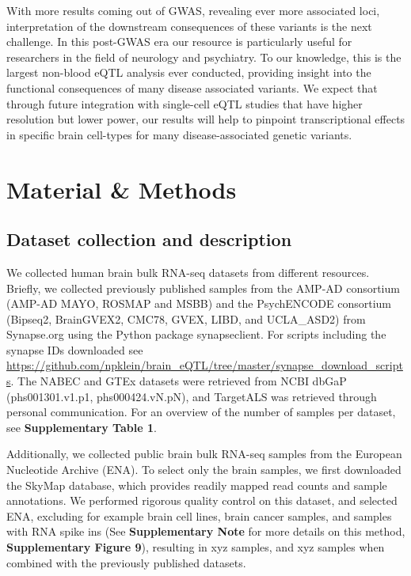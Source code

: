 {{With more results coming out of GWAS, revealing ever more associated loci, interpretation of the downstream consequences of these variants is the next challenge. In this post-GWAS era our resource is particularly useful for researchers in the field of neurology and psychiatry. To our knowledge, this is the largest non-blood eQTL analysis ever conducted, providing insight into the functional consequences of many disease associated variants. We expect that through future integration with single-cell eQTL studies that have higher resolution but lower power, our results will help to pinpoint transcriptional effects in specific brain cell-types for many disease-associated genetic variants. 

\section{Material \& Methods}
\subsection{Dataset collection and description }
We collected human brain bulk RNA-seq datasets from different resources. Briefly, we collected previously published samples from the AMP-AD consortium (AMP-AD MAYO\cite{hodesAcceleratingMedicinesPartnership2016}, ROSMAP\cite{hodesAcceleratingMedicinesPartnership2016} and MSBB\cite{hodesAcceleratingMedicinesPartnership2016}) and the PsychENCODE consortium (Bipseq2, BrainGVEX2, CMC78, GVEX, LIBD, and UCLA\_ASD2) from Synapse.org using the Python package synapseclient\cite{teamSynapseclientClientSynapse}. For scripts including the synapse IDs downloaded see \url{https://github.com/npklein/brain\_eQTL/tree/master/synapse\_download\_scripts}. The NABEC and GTEx datasets were retrieved from NCBI dbGaP (phs001301.v1.p1, phs000424.vN.pN), and TargetALS was retrieved through personal communication. For an overview of the number of samples per dataset, see \textbf{Supplementary Table 1}. 

Additionally, we collected public brain bulk RNA-seq samples from the European Nucleotide Archive (ENA). To select only the brain samples, we first downloaded the SkyMap database\cite{tsuiExtractingAllelicRead2018}, which provides readily mapped read counts and sample annotations. We performed rigorous quality control on this dataset, and selected ENA, excluding for example brain cell lines, brain cancer samples, and samples with RNA spike ins (See \textbf{Supplementary Note} for more details on this method, \textbf{Supplementary Figure 9}), resulting in xyz samples, and xyz samples when combined with the previously published datasets. 

}}

